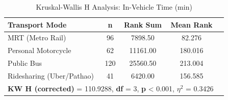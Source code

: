 \begin{table}[htbp]
\centering
\caption{Kruskal-Wallis H Analysis: In-Vehicle Time (min)}
\label{tab:analysis_03_in_vehicle_time}
\begin{tabular}{lcccc}
\hline
\textbf{Transport Mode} & \textbf{n} & \textbf{Rank Sum} & \textbf{Mean Rank} \\
\hline
MRT (Metro Rail) & 96 & 7898.50 & 82.276 \\
Personal Motorcycle & 62 & 11161.00 & 180.016 \\
Public Bus & 120 & 25560.50 & 213.004 \\
Ridesharing (Uber/Pathao) & 41 & 6420.00 & 156.585 \\
\hline
\multicolumn{4}{l}{\textbf{KW H (corrected)} = 110.9288, \textbf{df} = 3, \textbf{p} < 0.001, \textbf{$\eta^2$} = 0.3426} \\
\hline
\end{tabular}
\end{table}
